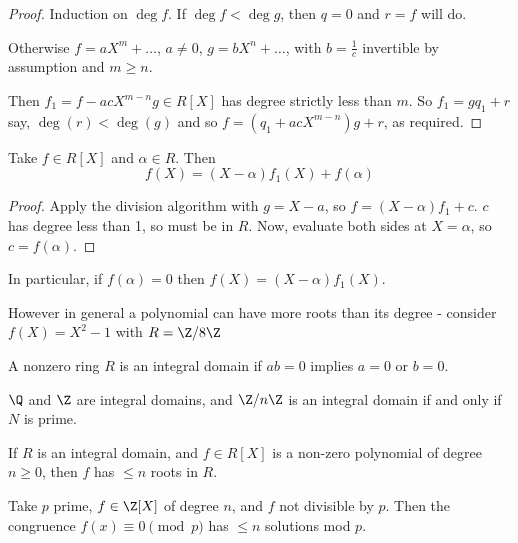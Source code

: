 \documentclass{article}
\begin{document}
\begin{proof}
    Induction on $\deg f$. If $\deg f < \deg g$, then $q = 0$ and $r = f$ will do.

    Otherwise $f = a X^m + \dots$, $a \neq 0$, $g = b X^n + \dots$, with $b = \frac{1}{c}$ invertible by assumption and $m \geq n$.

    Then $f_1 = f - ac X^{m-n} g \in R[X]$ has degree strictly less than $m$. So $f_1 = g q_1 + r$ say, $\deg(r) < \deg(g)$ and so $f = (q_1 + ac X^{m-n}) g + r$, as required.
\end{proof}

\begin{ncor}
    Take $f \in R[X]$ and $\alpha \in R$. Then \begin{equation*}f(X) = (X-\alpha) f_1(X) + f(\alpha)\end{equation*}
\end{ncor}

\begin{proof}
    Apply the division algorithm with $g=X-a$, so $f = (X-\alpha) f_1 + c$.
    $c$ has degree less than 1, so must be in $R$.
    Now, evaluate both sides at $X = \alpha$, so $c = f(\alpha)$.
\end{proof}

In particular, if $f(\alpha) = 0$ then $f(X) = (X - \alpha) f_1(X)$.

However in general a polynomial can have more roots than its degree - consider $f(X) = X^2 - 1$ with $R = \Z / 8\Z$

\begin{defi}
    A nonzero ring $R$ is an integral domain if $ab=0$ implies $a=0$ or $b=0$.
\end{defi}

\begin{eg}
    $\Q$ and $\Z$ are integral domains, and $\Z/n\Z$ is an integral domain if and only if $N$ is prime.
\end{eg}

\begin{nthm}\label{thm:2.7}
    If $R$ is an integral domain, and $f \in R[X]$ is a non-zero polynomial of degree $n \geq 0$, then $f$ has $\leq n$ roots in $R$.
\end{nthm}

\begin{cor}
    Take $p$ prime, $f \in \Z[X]$ of degree $n$, and $f$ not divisible by $p$.
    Then the congruence $f(x) \equiv 0 \pmod{p}$ has $\leq n$ solutions mod $p$.
\end{cor}
\end{document}
